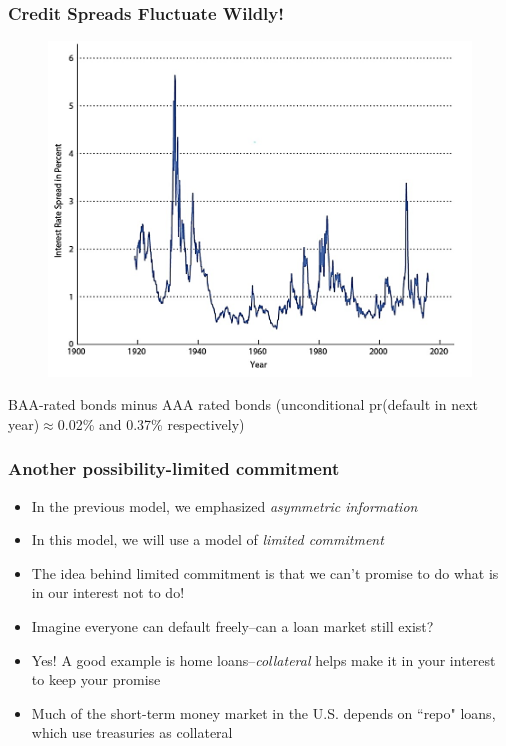 \documentclass{beamer}
\begin{document}
\begin{frame}
\frametitle[alignment=center]{Credit Spreads Fluctuate Wildly!}
\begin{figure}
\includegraphics[scale=0.5]{Figures/W_Fig_10pt4.png}
\end{figure}
BAA-rated bonds minus AAA rated bonds (unconditional pr(default in next year)$\approx$0.02\% and 0.37\% respectively) 
 \end{frame}

\begin{frame}
\frametitle[alignment=center]{Another possibility-limited commitment}
\begin{itemize}
\item In the previous model, we emphasized \emph{asymmetric information}
\bigskip
\item In this model, we will use a model of \emph{limited commitment}
\bigskip
\item The idea behind limited commitment is that we can't promise to do what is in our interest not to do!
\bigskip
\item Imagine everyone can default freely--can a loan market still exist?
\bigskip
\item Yes!  A good example is home loans--\emph{collateral} helps make it in your interest to keep your promise
\bigskip
\item Much of the short-term money market in the U.S. depends on ``repo" loans, which use treasuries as collateral 
\end{itemize}
 \end{frame}
\end{document}
